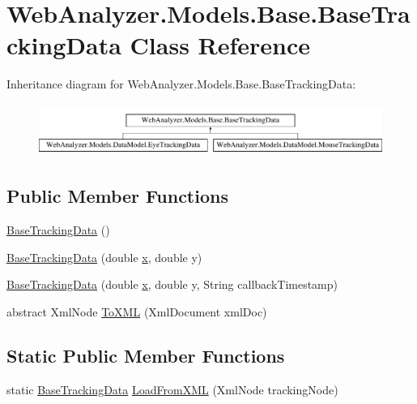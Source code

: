 \hypertarget{class_web_analyzer_1_1_models_1_1_base_1_1_base_tracking_data}{}\section{Web\+Analyzer.\+Models.\+Base.\+Base\+Tracking\+Data Class Reference}
\label{class_web_analyzer_1_1_models_1_1_base_1_1_base_tracking_data}
Inheritance diagram for Web\+Analyzer.\+Models.\+Base.\+Base\+Tracking\+Data\+:\begin{figure}[H]
\begin{center}
\leavevmode
\includegraphics[height=1.733746cm]{class_web_analyzer_1_1_models_1_1_base_1_1_base_tracking_data}
\end{center}
\end{figure}
\subsection*{Public Member Functions}
\begin{DoxyCompactItemize}
\item 
\hyperlink{class_web_analyzer_1_1_models_1_1_base_1_1_base_tracking_data_a2963b17bffe021ad55b9f237f2df8b33}{Base\+Tracking\+Data} ()
\item 
\hyperlink{class_web_analyzer_1_1_models_1_1_base_1_1_base_tracking_data_a696296a69335086be6efcb5ab1ee2a4e}{Base\+Tracking\+Data} (double \hyperlink{_u_i_2_h_t_m_l_resources_2js_2lib_2underscore_8min_8js_a81e910173af87b1161e719a504d52407}{x}, double y)
\item 
\hyperlink{class_web_analyzer_1_1_models_1_1_base_1_1_base_tracking_data_a6d087c8e01aa10dda54d09ba814f668d}{Base\+Tracking\+Data} (double \hyperlink{_u_i_2_h_t_m_l_resources_2js_2lib_2underscore_8min_8js_a81e910173af87b1161e719a504d52407}{x}, double y, String callback\+Timestamp)
\item 
abstract Xml\+Node \hyperlink{class_web_analyzer_1_1_models_1_1_base_1_1_base_tracking_data_a461cc41b4d928c47a376aa6ea76a1b91}{To\+X\+M\+L} (Xml\+Document xml\+Doc)
\end{DoxyCompactItemize}
\subsection*{Static Public Member Functions}
\begin{DoxyCompactItemize}
\item 
static \hyperlink{class_web_analyzer_1_1_models_1_1_base_1_1_base_tracking_data}{Base\+Tracking\+Data} \hyperlink{class_web_analyzer_1_1_models_1_1_base_1_1_base_tracking_data_a5c26d1acf65693fe2cc9f48b5b8f3db6}{Load\+From\+X\+M\+L} (Xml\+Node tracking\+Node)
\end{DoxyCompactItemize}
